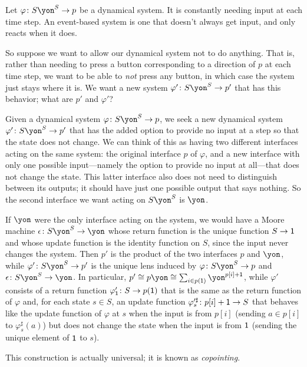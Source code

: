 \documentclass[Book-Poly]{subfiles}
\begin{document}
\begin{exercise}
Let $\varphi\colon S\yon^S\to p$ be a dynamical system. It is constantly needing input at each time step. An event-based system is one that doesn't always get input, and only reacts when it does.

So suppose we want to allow our dynamical system not to do anything. That is, rather than needing to press a button corresponding to a direction of $p$ at each time step, we want to be able to \emph{not} press any button, in which case the system just stays where it is. We want a new system $\varphi'\colon S\yon^S\to p'$ that has this behavior; what are $p'$ and $\varphi'$?
\begin{solution}
Given a dynamical system $\varphi\colon S\yon^S\to p$, we seek a new dynamical system $\varphi'\colon S\yon^S\to p'$ that has the added option to provide no input at a step so that the state does not change.
We can think of this as having two different interfaces acting on the same system: the original interface $p$ of $\varphi$, and a new interface with only one possible input---namely the option to provide no input at all---that does not change the state.
This latter interface also does not need to distinguish between its outputs; it should have just one possible output that says nothing.
So the second interface we want acting on $S\yon^S$ is $\yon$.

If $\yon$ were the only interface acting on the system, we would have a Moore machine $\epsilon\colon S\yon^S\to\yon$ whose return function is the unique function $S \to \textsf{1}$ and whose update function is the identity function on $S$, since the input never changes the system.
Then $p'$ is the product of the two interfaces $p$ and $\yon$, while $\varphi'\colon S\yon^S \to p'$ is the unique lens induced by $\varphi\colon S\yon^S\to p$ and $\epsilon\colon S\yon^S\to\yon$.
In particular, $p'\iso p\yon\iso\sum_{i\in p(\1)}\yon^{p[i]+\1}$, while $\varphi'$ consists of a return function $\varphi'_{\textsf{1}}\colon S \to p(\textsf{1})$ that is the same as the return function of $\varphi$ and, for each state $s\in S$, an update function $\varphi'^\sharp_s\colon p[i]+\textsf{1}\to S$ that behaves like the update function of $\varphi$ at $s$ when the input is from $p[i]$ (sending $a\in p[i]$ to $\varphi^\sharp_s(a)$) but does not change the state when the input is from $\textsf{1}$ (sending the unique element of $\textsf{1}$ to $s$).

This construction is actually universal; it is known as \emph{copointing}.
\end{solution}
\end{exercise}
\end{document}
